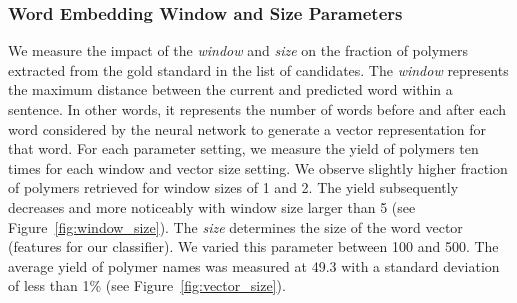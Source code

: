 
\subsubsection{Word Embedding Window and Size Parameters}
We measure the impact of the \textit{window} and \textit{size} on the fraction of polymers extracted from the gold standard in the list of  candidates.
The \textit{window} represents the maximum distance between the current and predicted word within a sentence. In other words, it represents the number of words before and after each word considered by the neural network to generate a vector representation for that word. 
For each parameter setting, we measure the yield of polymers ten times for each window and vector size setting.
We observe slightly higher fraction of polymers retrieved for window sizes of 1 and 2. The yield subsequently decreases and more noticeably with window size larger than 5 (see Figure~\ref{fig:window_size}).
The \textit{size} determines the size of the word vector (features for our classifier).
We varied this parameter between 100 and 500.
The average yield of polymer names was measured at 49.3 with a standard deviation of less than 1\% (see Figure~\ref{fig:vector_size}).


